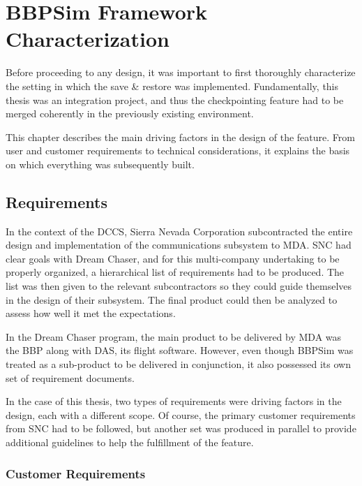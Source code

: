 {
\setlength{\parindent}{2em}
\chapter{BBPSim Framework Characterization}\label{cha:sim-env}
Before proceeding to any design, it was important to first thoroughly characterize the setting in which the save \& restore was implemented. Fundamentally, this thesis was an integration project, and thus the checkpointing feature had to be merged coherently in the previously existing environment.

This chapter describes the main driving factors in the design of the feature. From user and customer requirements to technical considerations, it explains the basis on which everything was subsequently built.

\section{Requirements}\label{sec:reqs}
In the context of the \gls{DCCS}, Sierra Nevada Corporation subcontracted the entire design and implementation of the communications subsystem to \gls{MDA}. \gls{SNC} had clear goals with Dream Chaser, and for this multi-company undertaking to be properly organized, a hierarchical list of requirements had to be produced. The list was then given to the relevant subcontractors so they could guide themselves in the design of their subsystem. The final product could then be analyzed to assess how well it met the expectations. 

In the Dream Chaser program, the main product to be delivered by \gls{MDA} was the \gls{BBP} along with \gls{DAS}, its flight software. However, even though \gls{BBPSim} was treated as a sub-product to be delivered in conjunction, it also possessed its own set of requirement documents.

In the case of this thesis, two types of requirements were driving factors in the design, each with a different scope. Of course, the primary customer requirements from \gls{SNC} had to be followed, but another set was produced in parallel to provide additional guidelines to help the fulfillment of the feature.  

\subsection*{Customer Requirements}

}
